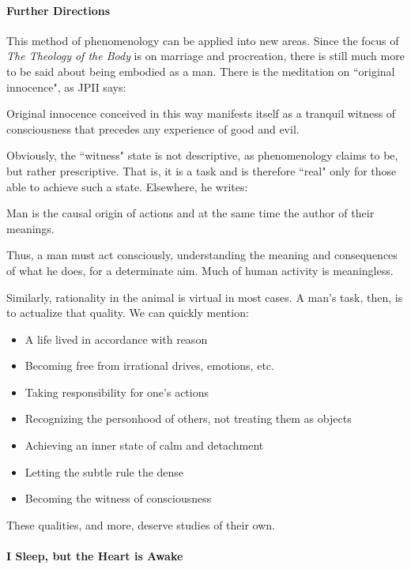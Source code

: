 \paragraph{Further Directions}
This method of phenomenology can be applied into new areas. Since the focus of \textit{The Theology of the Body} is on marriage and procreation, there is still much more to be said about being embodied as a man. There is the meditation on ``original innocence", as JPII says:

\begin{quotex}
Original innocence conceived in this way manifests itself as a tranquil witness of consciousness that precedes any experience of good and evil. 

\end{quotex}
Obviously, the ``witness" state is not descriptive, as phenomenology claims to be, but rather prescriptive. That is, it is a task and is therefore ``real" only for those able to achieve such a state. Elsewhere, he writes:

\begin{quotex}
Man is the causal origin of actions and at the same time the author of their meanings. 

\end{quotex}
Thus, a man must act consciously, understanding the meaning and consequences of what he does, for a determinate aim. Much of human activity is meaningless.

Similarly, rationality in the animal is virtual in most cases. A man's task, then, is to actualize that quality. We can quickly mention:

\begin{itemize}
\item A life lived in accordance with reason 
\item Becoming free from irrational drives, emotions, etc. 
\item Taking responsibility for one's actions 
\item Recognizing the personhood of others, not treating them as objects 
\item Achieving an inner state of calm and detachment 
\item Letting the subtle rule the dense 
\item Becoming the witness of consciousness 
\end{itemize}
These qualities, and more, deserve studies of their own.

\paragraph{I Sleep, but the Heart is Awake}

